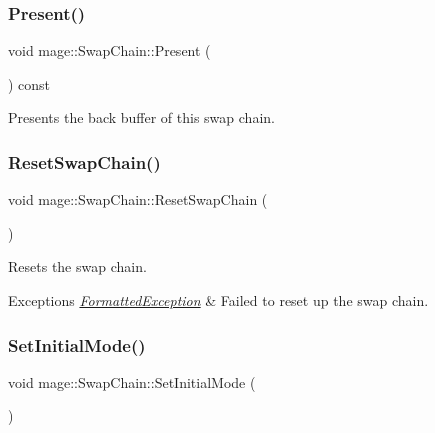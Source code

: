 \subsubsection{\texorpdfstring{Present()}{Present()}}
{\footnotesize\ttfamily void mage\+::\+Swap\+Chain\+::\+Present (\begin{DoxyParamCaption}{ }\end{DoxyParamCaption}) const\hspace{0.3cm}{\ttfamily [noexcept]}}

Presents the back buffer of this swap chain. \hypertarget{classmage_1_1_swap_chain_a30b25245e86823e1b08a39887de8d918}{}\label{classmage_1_1_swap_chain_a30b25245e86823e1b08a39887de8d918} 
\subsubsection{\texorpdfstring{Reset\+Swap\+Chain()}{ResetSwapChain()}}
{\footnotesize\ttfamily void mage\+::\+Swap\+Chain\+::\+Reset\+Swap\+Chain (\begin{DoxyParamCaption}{ }\end{DoxyParamCaption})\hspace{0.3cm}{\ttfamily [private]}}

Resets the swap chain.


\begin{DoxyExceptions}{Exceptions}
{\em \hyperlink{classmage_1_1_formatted_exception}{Formatted\+Exception}} & Failed to reset up the swap chain. \\
\hline
\end{DoxyExceptions}
\hypertarget{classmage_1_1_swap_chain_a662009705a6e23064351fd0d9b77ef0e}{}\label{classmage_1_1_swap_chain_a662009705a6e23064351fd0d9b77ef0e} 
\subsubsection{\texorpdfstring{Set\+Initial\+Mode()}{SetInitialMode()}}
{\footnotesize\ttfamily void mage\+::\+Swap\+Chain\+::\+Set\+Initial\+Mode (\begin{DoxyParamCaption}{ }\end{DoxyParamCaption})}


